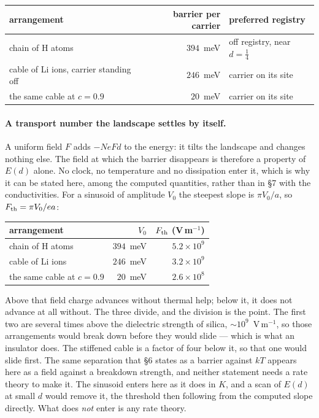 \documentclass[11pt]{article}
\begin{document}
\begin{center}
\small
\begin{tabular}{@{}lrl@{}}
\toprule
arrangement & barrier per carrier & preferred registry\\
\midrule
chain of H atoms & $394$~meV & off registry, near $d=\tfrac14$\\
cable of Li ions, carrier standing off & $246$~meV & carrier on its site\\
\quad the same cable at $c=0.9$ & $20$~meV & carrier on its site\\
\bottomrule
\end{tabular}
\end{center}

\paragraph{A transport number the landscape settles by itself.} A uniform field $F$ adds $-NeFd$ to the
energy: it tilts the landscape and changes nothing else. The field at which the barrier disappears
is therefore a property of $E(d)$ alone. No clock, no temperature and no dissipation enter it,
which is why it can be stated here, among the computed quantities, rather than in \S7 with the
conductivities. For
a sinusoid of amplitude $V_0$ the steepest slope is $\pi V_0/a$, so $F_{\rm th}=\pi V_0/ea$:
\begin{center}
\small
\begin{tabular}{@{}lrr@{}}
\toprule
arrangement & $V_0$ & $F_{\rm th}$ (V\,m$^{-1}$)\\
\midrule
chain of H atoms & $394$~meV & $5.2\times10^{9}$\\
cable of Li ions & $246$~meV & $3.2\times10^{9}$\\
\quad the same cable at $c=0.9$ & $20$~meV & $2.6\times10^{8}$\\
\bottomrule
\end{tabular}
\end{center}
\noindent Above that field charge advances without thermal help; below it, it does not advance at
all without. The three divide, and the division is the point. The first two are several times above the
dielectric strength of silica, ${\sim}10^{9}$~V\,m$^{-1}$, so those arrangements would break down
before they would slide --- which is what an insulator does. The stiffened cable is a factor of four
below it, so that one would slide first. The same separation that \S6 states as a barrier against
$kT$ appears here as a field against a breakdown strength, and neither statement needs a rate
theory to make it. The sinusoid enters here
as it does in $K$, and a scan of $E(d)$ at small $d$ would remove it, the threshold then following
from the computed slope directly. What does \emph{not} enter is any rate theory.
\end{document}
